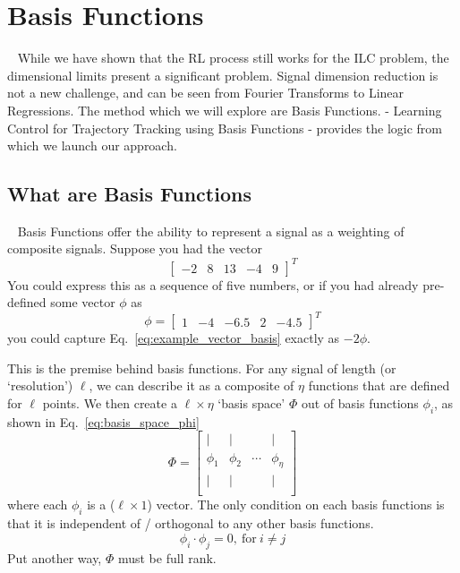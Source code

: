 
\FloatBarrier\section{Basis Functions}
~\label{sec:basis_functions}
While we have shown that the RL process still works for the ILC problem, the dimensional limits present a significant problem. Signal dimension reduction is not a new challenge, and can be seen from Fourier Transforms to Linear Regressions. The method which we will explore are Basis Functions. \cite{PhanFrueh1996} - Learning Control for Trajectory Tracking using Basis Functions - provides the logic from which we launch our approach. 

\FloatBarrier\subsection{What are Basis Functions}
~\label{sub:what_are_basis}
Basis Functions offer the ability to represent a signal as a weighting of composite signals. Suppose you had the vector
\begin{equation}
    \begin{bmatrix}
        -2 & 8 & 13 & -4 & 9
    \end{bmatrix}^T
    \label{eq:example_vector_basis}
\end{equation}
You could express this as a sequence of five numbers, or if you had already pre-defined some vector $\phi$ as
\begin{equation}
    \phi = 
    \begin{bmatrix}
        1 & -4 & -6.5 & 2 & -4.5
    \end{bmatrix}^T
\end{equation}
you could capture Eq.~\ref{eq:example_vector_basis} exactly as $-2\phi$. 

This is the premise behind basis functions. For any signal of length (or `resolution') $\ell$, we can describe it as a composite of $\eta$ functions that are defined for $\ell$ points. We then create a $\ell \times \eta$ `basis space' $\Phi$ out of basis functions $\phi_i$, as shown in Eq.~\ref{eq:basis_space_phi}
\begin{equation}
    \Phi = 
    \begin{bmatrix}
        | & | &  & | \\
        \phi_1 & \phi_2 & \cdots & \phi_{\eta} \\
        | & | &  & | \\
    \end{bmatrix}
    \label{eq:basis_space_phi}
\end{equation}
where each $\phi_i$ is a ($\ell \times 1$) vector. The only condition on each basis functions is that it is independent of / orthogonal to any other basis functions.
\begin{equation}
    \phi_i \cdot \phi_j = 0,\ \text{for}\ i \ne j
    \label{eq:orthogonal_basis}
\end{equation}
Put another way, $\Phi$ must be full rank. 

